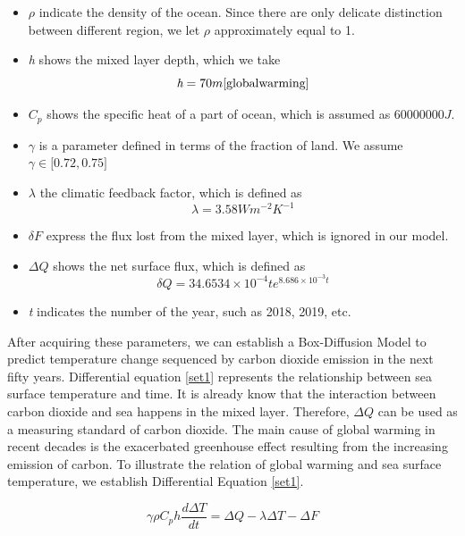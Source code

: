 \documentclass{mcmthesis}
\begin{document}
\begin{itemize}
	\item $\rho$ indicate the density of the ocean. Since there are only delicate distinction between different region, we let $\rho$ approximately equal to 1. 
	\item \emph{h} shows the mixed layer depth, which we take\cite{globalwarming}
		\begin{equation*}
		\emph{h}  = 70m \cite{globalwarming}
		\end {equation*}
	\item $C_p$ shows the specific heat of a part of ocean, which is assumed as $60000000J$.
	\item $\gamma$ is a parameter defined in terms of the fraction of land. We assume $\gamma \in \big[0.72,0.75\big]$ \cite{co2dat}
	\item $\lambda$ the climatic feedback factor, which is defined as \cite{globalwarming}
		\begin{equation*}
		\lambda = 3.58 W m^{-2} K^{-1}
		\end {equation*}
	\item  $\delta F$ express the flux lost from the mixed layer, which is ignored in our model. 
	\item $\Delta Q$ shows the net surface flux, which is defined as\cite{modelsol}
		\begin{equation*}
		\delta Q = 34.6534 \times 10^{-4}te^{8.686\times 10^{-3}t}
		\end {equation*}
	\item \emph{t} indicates the number of the year, such as 2018, 2019, etc.
\end{itemize}
\par
	After acquiring these parameters, we can establish a Box-Diffusion Model\cite{funct} to predict temperature change sequenced by carbon dioxide emission in the next fifty years. Differential equation \ref{set1} represents the relationship between sea surface temperature and time. It is already know that the interaction between carbon dioxide and sea happens in the mixed layer. Therefore, $\Delta Q$ can be used as a measuring standard of carbon dioxide. The main cause of global warming in recent decades is the exacerbated greenhouse effect resulting from the increasing emission of carbon. To illustrate the relation of global warming and sea surface temperature, we establish Differential Equation \ref{set1}.
\begin{spacing}{1.5}
\begin{equation*}\label{set1}
\gamma\rho C_{p} h\frac{d\Delta T}{dt} = \Delta Q - \lambda\Delta T - \Delta F
\end{equation*}
\end{spacing}
\end{document}
